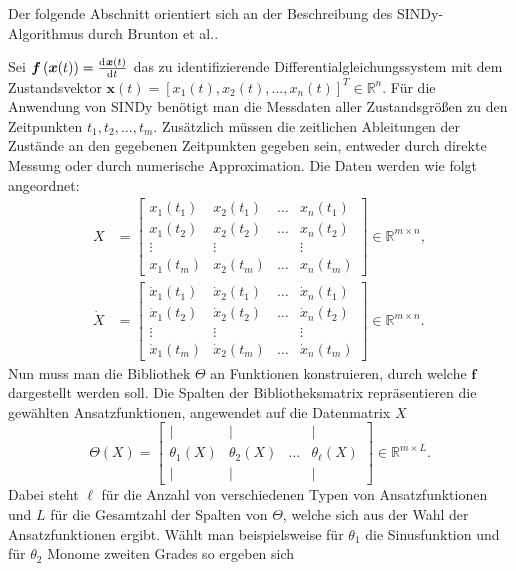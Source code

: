 Der folgende Abschnitt orientiert sich an der Beschreibung des SINDy-Algorithmus durch Brunton et al.\cite{Brunton2016}. 

Sei $\boldsymbol{f}\left(\boldsymbol{x}(t)\right) = \frac{\mathrm{d}^{}\boldsymbol{x}(t)}{\mathrm{d}{t}^{}}$ das zu identifizierende Differentialgleichungssystem mit dem Zustandsvektor $\boldsymbol{x}(t) = [x_1(t), x_2(t), ... , x_n(t)]^T \in\mathbb{R}^n$.
Für die Anwendung von SINDy benötigt man die Messdaten aller Zustandsgrößen zu den Zeitpunkten $t_1, t_2, ..., t_m$. Zusätzlich müssen die zeitlichen Ableitungen der Zustände an den gegebenen Zeitpunkten gegeben sein, entweder durch direkte Messung oder durch numerische Approximation. Die Daten werden wie folgt angeordnet: 
\begin{align}
X &= \begin{bmatrix}
		x_1(t_1) & x_2(t_1) & \dots & x_n(t_1) \\
		x_1(t_2) & x_2(t_2) & \dots & x_n(t_2) \\
		\vdots   & \vdots   & 		& \vdots \\ 
		x_1(t_m) & x_2(t_m) & \dots & x_n(t_m)
	\end{bmatrix} \in \mathbb{R}^{m\times n},
	\\
	\dot{X} &= \begin{bmatrix} 
		\dot{x}_1(t_1) & \dot{x}_2(t_1) & \dots & \dot{x}_n(t_1) \\
		\dot{x}_1(t_2) & \dot{x}_2(t_2) & \dots & \dot{x}_n(t_2) \\
		\vdots 		   & \vdots 		& 		& \vdots \\
		\dot{x}_1(t_m) & \dot{x}_2(t_m) & \dots & \dot{x}_n(t_m)
	\end{bmatrix}  \in \mathbb{R}^{m\times n}.
\end{align}
Nun muss man die Bibliothek $\Theta$ an Funktionen konstruieren, durch welche $\boldsymbol{f}$ dargestellt werden soll. 
Die Spalten der Bibliotheksmatrix repräsentieren die gewählten Ansatzfunktionen, angewendet auf die Datenmatrix $X$
\begin{equation}
\Theta(X) = \begin{bmatrix}
		\mid & \mid & & \mid \\
		\theta_1(X) & \theta_2(X) & \dots & \theta_\ell(X) \\
		\mid & \mid & & \mid 
	\end{bmatrix}\in\mathbb{R}^{m\times L}.
\end{equation} 
Dabei steht $\ell$ für die Anzahl von verschiedenen Typen von Ansatzfunktionen und $L$ für die Gesamtzahl der Spalten von $\Theta$, welche sich aus der Wahl der Ansatzfunktionen ergibt. Wählt man beispielsweise für $\theta_1$ die Sinusfunktion und für $\theta_2$ Monome zweiten Grades so ergeben sich 
